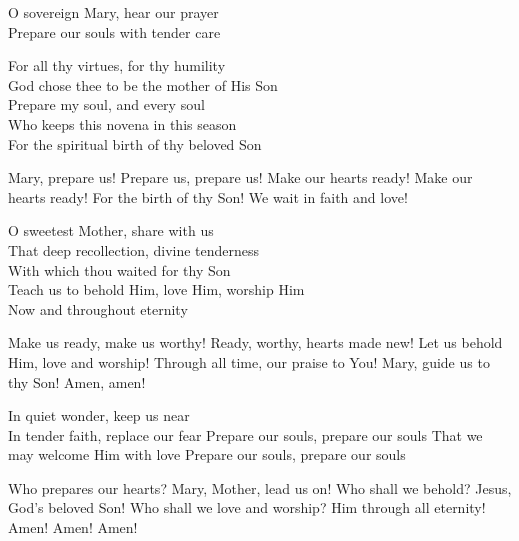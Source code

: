 \begin{lyrics}
O sovereign Mary, hear our prayer\\
Prepare our souls with tender care

For all thy virtues, for thy humility\\
God chose thee to be the mother of His Son\\
Prepare my soul, and every soul\\
Who keeps this novena in this season\\
For the spiritual birth of thy beloved Son

 Mary, prepare us!
 Prepare us, prepare us!
 Make our hearts ready!
 Make our hearts ready!
 For the birth of thy Son!
 We wait in faith and love!

O sweetest Mother, share with us\\
That deep recollection, divine tenderness\\
With which thou waited for thy Son\\
Teach us to behold Him, love Him, worship Him\\
Now and throughout eternity

 Make us ready, make us worthy!
 Ready, worthy, hearts made new!
 Let us behold Him, love and worship!
 Through all time, our praise to You!
 Mary, guide us to thy Son!
 Amen, amen!

In quiet wonder, keep us near\\
In tender faith, replace our fear
 Prepare our souls, prepare our souls
 That we may welcome Him with love
 Prepare our souls, prepare our souls

 Who prepares our hearts?
 Mary, Mother, lead us on!
 Who shall we behold?
 Jesus, God's beloved Son!
 Who shall we love and worship?
 Him through all eternity!
 Amen! Amen! Amen!
\end{lyrics}


